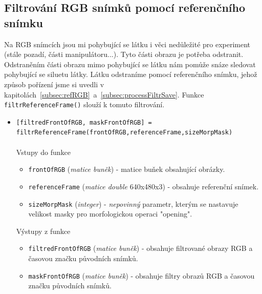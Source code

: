 \documentclass[10pt,a4paper,titlepage,oneside]{report}
\begin{document}
\subsection{Filtrování RGB snímků pomocí referenčního snímku}
\label{subsec:matfiltr}
Na RGB snímcích jsou mi pohybující se látku i věci nedůležité pro experiment (stále pozadí, části manipulátoru...). Tyto části obrazu je potřeba odstranit. Odstraněním části obrazu mimo pohybující se látku nám pomůže snáze sledovat pohybující se siluetu látky. Látku odstraníme pomocí referenčního snímku, jehož způsob pořízení jsme si uvedli v kapitolách~\ref{subsec:refRGB}~a~\ref{subsec:processFiltrSave}. Funkce \verb|filtrReferenceFrame()| slouží k tomuto filtrování.
\begin{itemize}
  	\item \verb|[filtredFrontOfRGB, maskFrontOfRGB] =|\\ \verb|filtrReferenceFrame(frontOfRGB,referenceFrame,sizeMorpMask)|\\
\\
    		Vstupy do funkce
        		\begin{itemize}
  			\item \verb|frontOfRGB| (\textit{matice buněk}) - matice buňek obsahující obrázky.
  			\item \verb|referenceFrame| (\textit{matice double} 640x480x3) - obsahuje referenční snímek.
  			\item \verb|sizeMorpMask| (\textit{integer}) - \textit{nepovinný} parametr, kterým se nastavuje velikost masky pro morfologickou  operaci "opening"\cite{hlavacOpen}.
    			\end{itemize}
    		Výstupy z funkce
        		\begin{itemize}
        		\item \verb|filtredFrontOfRGB| (\textit{matice buněk}) - obsahuje filtrované obrazy RGB a časovou značku původních snímků.
  			\item \verb|maskFrontOfRGB| (\textit{matice buněk}) - obsahuje filtry obrazů RGB a časovou značku původních snímků.
    			\end{itemize}
    \end{itemize}
\end{document}

